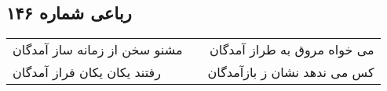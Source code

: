 \begin{center}
\section*{رباعی شماره ۱۴۶}
\label{sec:sh146}
\begin{longtable}{l p{0.5cm} r}
مشنو سخن از زمانه ساز آمدگان
&&
می خواه مروق به طراز آمدگان
\\
رفتند یکان یکان فراز آمدگان
&&
کس می ندهد نشان ز بازآمدگان
\\
\end{longtable}
\end{center}
